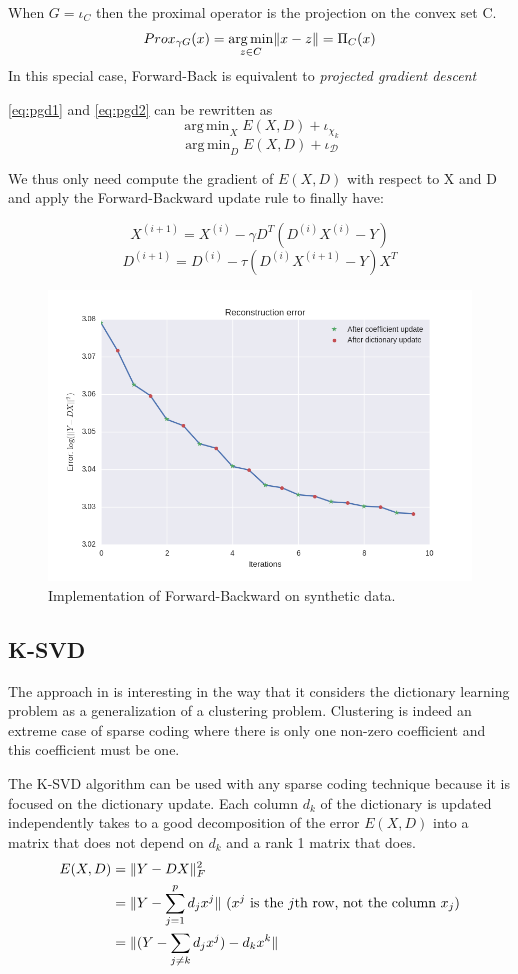 \documentclass[a4paper,11pt]{article}
\DeclarePairedDelimiter\norm{\lVert}{\rVert} %
\DeclareMathOperator*{\argmin}{arg\,min} %
\begin{document}
When $G = \iota_C$ then the proximal operator is the projection on the convex set C.
$$Prox_{\gamma G}(x) = \argmin_{z \in C} \norm{x - z} = \Pi_C(x)$$
In this special case, Forward-Back is equivalent to \emph{projected gradient descent}

\ref{eq:pgd1} and \ref{eq:pgd2} can be rewritten as
$$\argmin_X E(X,D) + \iota_{\chi_k}$$
$$\argmin_D E(X,D) + \iota_{\mathcal{D}}$$

We thus only need compute the gradient of $E(X,D)$ with respect to X and D and apply the Forward-Backward update rule to finally have:

$$ X^{(i+1)} = X^{(i)} - \gamma D^T (D^{(i)}X^{(i)} - Y) $$
$$ D^{(i+1)} = D^{(i)} - \tau (D^{(i)}X^{(i+1)} - Y) X^T $$

\begin{figure}[!htbp]
\centering
  \includegraphics[width=\linewidth]{fb_12_iter_synthetic.png}
  \caption{Implementation of Forward-Backward on synthetic data.}
\end{figure}

\subsection{K-SVD}
The approach in \cite{aharon06} is interesting in the way that it considers the dictionary learning problem as a generalization of a clustering problem. Clustering is indeed an extreme case of sparse coding where there is only one non-zero coefficient and this coefficient must be one.

The K-SVD algorithm can be used with any sparse coding technique because it is focused on the dictionary update.
Each column $d_k$ of the dictionary is updated independently takes to a good decomposition of the error $E(X,D)$ into a matrix that does not depend on $d_k$ and a rank 1 matrix that does.
\begin{equation} \label{eq:ksvd1}
\begin{split}
  E(X,D) & = \norm{Y - DX}_F^2 \\
  		 & = \norm{Y - \sum\limits_{j=1}^{p} d_j x^j} \text{ ($x^j$ is the $j$th row, not the column $x_j$)}\\
         & = \norm{(Y - \sum\limits_{j \neq k} d_j x^j)  - d_k x^k}
\end{split}
\end{equation}
\end{document}

